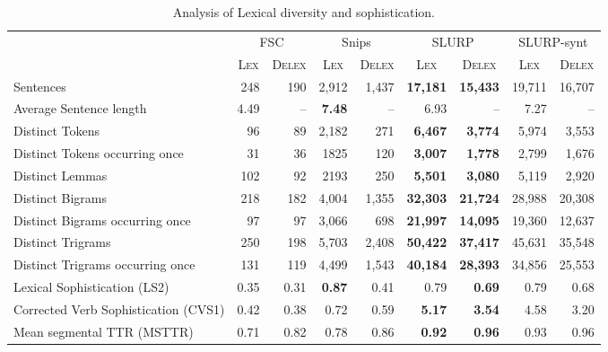 \documentclass[11pt,a4paper]{article}
\newcommand{\datasetacr}{SLURP}
\begin{document}
\begin{table*}[!ht]
    \centering
    \footnotesize
\begin{tabular}{lrrrrrrrr}
\hline
        & \multicolumn{2}{c}{FSC}      & \multicolumn{2}{c}{Snips}       & \multicolumn{2}{c}{\datasetacr}       & \multicolumn{2}{c}{\datasetacr-synt}   \\
    &   \multicolumn{1}{c}{\textsc{Lex}} & \multicolumn{1}{c}{\textsc{Delex}} &   \multicolumn{1}{c}{\textsc{Lex}} & \multicolumn{1}{c}{\textsc{Delex}} &   \multicolumn{1}{c}{\textsc{Lex}} & \multicolumn{1}{c}{\textsc{Delex}} &   \multicolumn{1}{c}{\textsc{Lex}} & \multicolumn{1}{c}{\textsc{Delex}} \\
\hline
Sentences &248 &190 &2,912 &1,437 &\textbf{17,181} &\textbf{15,433} &19,711 & 16,707 \\
Average Sentence length  & 4.49 & -- & \textbf{7.48} & -- & 6.93 & -- & 7.27 & -- \\
Distinct Tokens &96 &89 &2,182 &271 &\textbf{6,467} &\textbf{3,774} &5,974 & 3,553 \\
Distinct Tokens occurring once &31 &36 &1825 &120 &\textbf{3,007} &\textbf{1,778} &2,799 & 1,676 \\
Distinct Lemmas &102 &92 &2193 &250 &\textbf{5,501} &\textbf{3,080} &5,119 & 2,920 \\
Distinct Bigrams &218 &182 &4,004 &1,355 &\textbf{32,303} &\textbf{21,724} &28,988 & 20,308 \\
Distinct Bigrams occurring once &97 &97 &3,066 &698 &\textbf{21,997} &\textbf{14,095} &19,360 & 12,637 \\
Distinct Trigrams &250 &198 &5,703 &2,408 &\textbf{50,422} &\textbf{37,417} &45,631 & 35,548 \\
Distinct Trigrams occurring once &131 &119 &4,499 &1,543 &\textbf{40,184} &\textbf{28,393} &34,856 & 25,553 \\
Lexical Sophistication (LS2) &0.35 &0.31 &\textbf{0.87} &0.41 &0.79 &\textbf{0.69} &0.79 & 0.68 \\
Corrected Verb Sophistication (CVS1) &0.42 &0.38 &0.72 &0.59 &\textbf{5.17} &\textbf{3.54} &4.58 & 3.20 \\
Mean segmental TTR (MSTTR) & 0.71 & 0.82 & 0.78 & 0.86 &\textbf{0.92} &\textbf{0.96} & 0.93 & 0.96 \\
\hline
\end{tabular}
    \caption{Analysis of Lexical diversity and sophistication. }
    \label{tab:lexical}
\end{table*}
\end{document}

